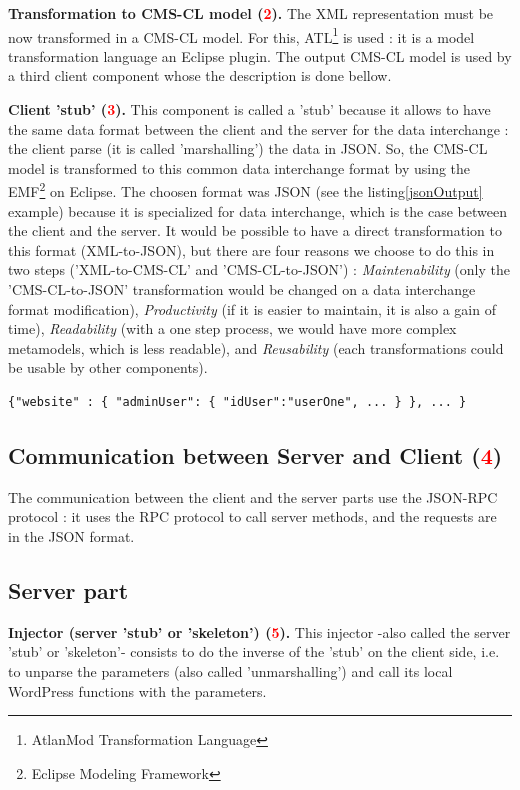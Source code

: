 		\vspace{0.15em}
		\noindent\textbf{Transformation to CMS-CL model (\textcolor{red}{2}).} The XML representation must be now transformed in a CMS-CL model. For this, ATL\footnote{AtlanMod Transformation Language} is used : it is a model transformation language an Eclipse plugin. The output CMS-CL model is used by a third client component whose the description is done bellow.
		
		\vspace{0.15em}
		\noindent\textbf{Client 'stub' (\textcolor{red}{3}).} This component is called a 'stub' because it allows to have the same data format between the client and the server for the data interchange : the client parse (it is called 'marshalling') the data in JSON. So, the CMS-CL model is transformed to this common data interchange format by using the EMF\footnote{Eclipse Modeling Framework} \cite{emfPresent} on Eclipse.		
		The choosen format was JSON (see the listing\ref{jsonOutput} example) because it is specialized for data interchange, which is the case between the client and the server. It would be possible to have a direct transformation to this format (XML-to-JSON), but there are four reasons we choose to do this in two steps ('XML-to-CMS-CL' and 'CMS-CL-to-JSON') : \textit{Maintenability} (only the 'CMS-CL-to-JSON' transformation would be changed on a data interchange format modification),  \textit{Productivity} (if it is easier to maintain, it is also a gain of time), \textit{Readability} (with a one step process, we would have more complex metamodels, which is less readable), and \textit{Reusability} (each transformations could be usable by other components).
			\lstset{
  								caption=Web site elements in JSON, 
  								label=jsonOutput,
 								basicstyle=\scriptsize,
  								xleftmargin=.110\columnwidth , xrightmargin=.110\columnwidth
						}
			\begin{lstlisting}
{"website" : { "adminUser": { "idUser":"userOne", ... } }, ... }			
			\end{lstlisting}
	
	\subsection{Communication between Server and Client (\textcolor{red}{4})}
	The communication between the client and the server parts use the JSON-RPC\cite{jsonRpc} protocol : it uses the RPC protocol to call server methods, and the requests are in the JSON format.			
	\subsection{Server part}
		\textbf{Injector (server 'stub' or 'skeleton') (\textcolor{red}{5}).} This injector -also called the server 'stub' or 'skeleton'- consists to do the inverse of the 'stub' on the client side, i.e. to unparse the parameters (also called 'unmarshalling') and call its local WordPress functions with the parameters.
					
